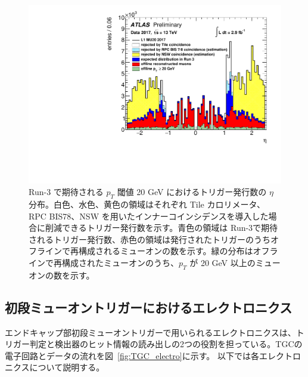 \begin{figure}[tb]
  \centering
    \includegraphics[clip, width=14cm]{fig/3/ATL-COM-DAQ-2018-033-fig2.pdf}
  \caption{Run-3 で期待される $p_T$ 閾値 20 GeV におけるトリガー発行数の $\eta$ 分布。白色、水色、黄色の領域はそれぞれ Tile カロリメータ、RPC BIS78、NSW を用いたインナーコインシデンスを導入した場合に削減できるトリガー発行数を示す。青色の領域は Run-3で期待されるトリガー発行数、赤色の領域は発行されたトリガーのうちオフラインで再構成されるミューオンの数を示す。緑の分布はオフラインで再構成されたミューオンのうち、$p_T$ が 20 GeV 以上のミューオンの数を示す。}
  \label{fig:Rate_innercoincidence}
\end{figure}


\newpage
\subsection{初段ミューオントリガーにおけるエレクトロニクス}
エンドキャップ部初段ミューオントリガーで用いられるエレクトロニクスは、トリガー判定と検出器のヒット情報の読み出しの2つの役割を担っている。TGCの電子回路とデータの流れを図~\ref{fig:TGC_electro}に示す。
以下では各エレクトロニクスについて説明する。

